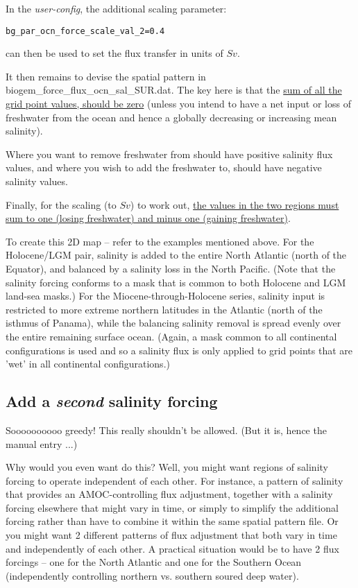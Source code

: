 In the \textit{user-config}, the additional scaling parameter:
\vspace{-1mm}\small\begin{verbatim}
bg_par_ocn_force_scale_val_2=0.4
\end{verbatim}\normalsize\vspace{-1mm}
can then be used to set the flux transfer in units of \(Sv\).

It then remains to devise the spatial pattern in \textsf{\footnotesize biogem\_force\_flux\_ocn\_sal\_SUR.dat}. The key here is that the \uline{sum of all the grid point values, should be zero} (unless you intend to have a net input or loss of freshwater from the ocean and hence a globally decreasing or increasing mean salinity).

Where you want to remove freshwater from should have positive salinity flux values, and where you wish to add the freshwater to, should have negative salinity values.

Finally, for the scaling (to \(Sv\)) to work out, \uline{the values in the two regions must sum to one (losing freshwater) and minus one (gaining freshwater)}.

To create this 2D map -- refer to the examples mentioned above.
For the Holocene/LGM pair, salinity is added to the entire North Atlantic (north of the Equator), and balanced by a salinity loss in the North Pacific. (Note that the salinity forcing conforms to a mask that is common to both Holocene and LGM land-sea masks.) For the Miocene-through-Holocene series, salinity input is restricted to more extreme northern latitudes in the Atlantic (north of the isthmus of Panama), while the balancing salinity removal is spread evenly over the entire remaining surface ocean. (Again, a mask common to all continental configurations is used and so a salinity flux is only applied to grid points that are 'wet' in all continental configurations.)

%
\newpage
\subsection*{Add a \textit{second} salinity forcing}
\vspace{1mm}

Soooooooooo greedy! This really shouldn't be allowed. (But it is, hence the manual entry ...)

Why would you even want do this? Well, you might want regions of salinity forcing to operate independent of each other. For instance, a pattern of salinity that provides an AMOC-controlling flux adjustment, together with a salinity forcing elsewhere that might vary in time, or simply to simplify the additional forcing rather than have to combine it within the same spatial pattern file. Or you might want 2 different patterns of flux adjustment that both vary in time and independently of each other. A practical situation would be to have 2 flux forcings -- one for the North Atlantic and one for the Southern Ocean (independently controlling northern vs. southern soured deep water).

